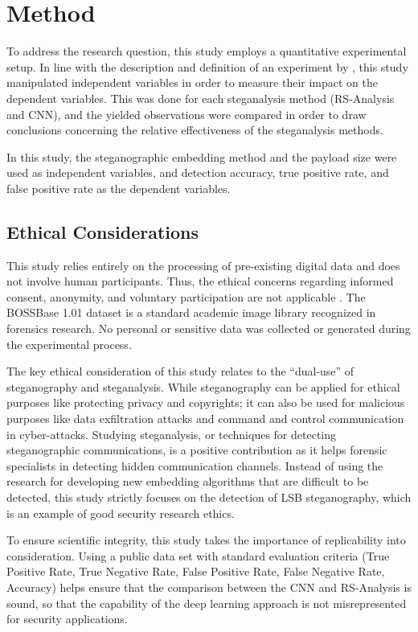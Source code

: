 \chapter{Method} \label{cha:method}

To address the research question, this study employs a quantitative experimental setup. 
In line with the description and definition of an experiment by \textcite{Denscombe2014}, this study manipulated independent variables in order to measure their impact on the dependent variables. 
This was done for each steganalysis method (RS-Analysis and CNN), and the yielded observations were compared in order to draw conclusions concerning the relative effectiveness of the steganalysis methods.

In this study, the steganographic embedding method and the payload size were used as independent variables, and detection accuracy, true positive rate, and false positive rate as the dependent variables.

\section{Ethical Considerations}
This study relies entirely on the processing of pre-existing digital data and does not involve human participants. 
Thus, the ethical concerns regarding informed consent, anonymity, and voluntary participation are not applicable \cite{Denscombe2014}. 
The BOSSBase 1.01 dataset \cite{bas2011break} is a standard academic image library recognized in forensics research. 
No personal or sensitive data was collected or generated during the experimental process.

The key ethical consideration of this study relates to the “dual-use” of steganography and steganalysis. 
While steganography can be applied for ethical purposes like protecting privacy and copyrights; it can also be used for malicious purposes like data exfiltration attacks and command and control communication in cyber-attacks. 
Studying steganalysis, or techniques for detecting steganographic communications, is a positive contribution as it helps forensic specialists in detecting hidden communication channels. 
Instead of using the research for developing new embedding algorithms that are difficult to be detected, this study strictly focuses on the detection of LSB steganography, which is an example of good security research ethics. 

To ensure scientific integrity, this study takes the importance of replicability into consideration. 
Using a public data set with standard evaluation criteria (True Positive Rate, True Negative Rate, False Positive Rate, False Negative Rate, Accuracy) helps ensure that the comparison between the CNN and RS-Analysis is sound, so that the capability of the deep learning approach is not misrepresented for security applications.

